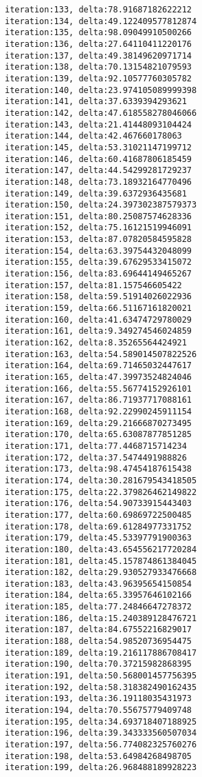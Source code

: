 \documentclass[11pt]{article}
\begin{document}
\begin{Verbatim}[commandchars=\\\{\}]
iteration:133, delta:78.91687182622212
iteration:134, delta:49.122409577812874
iteration:135, delta:98.09049910500266
iteration:136, delta:27.64110411220176
iteration:137, delta:49.38149620971714
iteration:138, delta:70.13154821079593
iteration:139, delta:92.10577760305782
iteration:140, delta:23.974105089999398
iteration:141, delta:37.6339394293621
iteration:142, delta:47.618558278046066
iteration:143, delta:21.41448093104424
iteration:144, delta:42.467660178063
iteration:145, delta:53.31021147199712
iteration:146, delta:60.41687806185459
iteration:147, delta:44.54299281729237
iteration:148, delta:73.18932164770496
iteration:149, delta:39.6372936435681
iteration:150, delta:24.397302387579373
iteration:151, delta:80.25087574628336
iteration:152, delta:75.16121519946091
iteration:153, delta:87.07820584595828
iteration:154, delta:63.39754432048099
iteration:155, delta:39.67629533415072
iteration:156, delta:83.69644149465267
iteration:157, delta:81.157546605422
iteration:158, delta:59.51914026022936
iteration:159, delta:66.51167161820021
iteration:160, delta:41.63474729780029
iteration:161, delta:9.349274546024859
iteration:162, delta:8.35265564424921
iteration:163, delta:54.589014507822526
iteration:164, delta:69.71465032447617
iteration:165, delta:47.39973524824046
iteration:166, delta:55.56774152926101
iteration:167, delta:86.71937717088161
iteration:168, delta:92.22990245911154
iteration:169, delta:29.21666870273495
iteration:170, delta:65.63087877851285
iteration:171, delta:77.4468715714234
iteration:172, delta:37.5474491988826
iteration:173, delta:98.47454187615438
iteration:174, delta:30.281679543418505
iteration:175, delta:22.379826462149822
iteration:176, delta:54.90733915443403
iteration:177, delta:60.69869722500485
iteration:178, delta:69.61284977331752
iteration:179, delta:45.53397791900363
iteration:180, delta:43.654556217720284
iteration:181, delta:45.157874861384045
iteration:182, delta:29.930527933476668
iteration:183, delta:43.96395654150854
iteration:184, delta:65.33957646102166
iteration:185, delta:77.24846647278372
iteration:186, delta:15.240389128476721
iteration:187, delta:84.67552216829017
iteration:188, delta:54.98520736954475
iteration:189, delta:19.216117886708417
iteration:190, delta:70.37215982868395
iteration:191, delta:50.568001457756395
iteration:192, delta:58.318382490162435
iteration:193, delta:36.19118035431973
iteration:194, delta:70.55675779409748
iteration:195, delta:34.693718407188925
iteration:196, delta:39.343333560507034
iteration:197, delta:56.774082325760276
iteration:198, delta:53.64984268498705
iteration:199, delta:26.968488189928223

\end{Verbatim}
\end{document}
